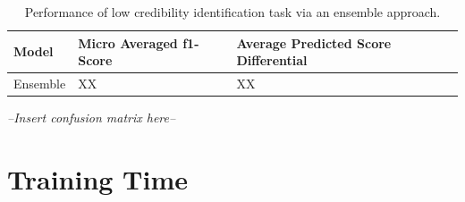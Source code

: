 \documentclass[a4paper,twoside,phd]{BYUPhys}
\begin{document}
\begin{table}[H]
	\centering
	
	\begin{tabular}{|p{4cm}|p{4cm}|p{4cm}|}
		\hline
		
		\textbf{Model} & \textbf{Micro Averaged \newline f1-Score} & \textbf{Average Predicted Score Differential}                                                                                                                                                                                                                                                                                                                                           \\
		\hline                                                                                                                                              
		
		Ensemble & XX & XX \\
		\hline
		
		
		
	\end{tabular}
	\caption{Performance of low credibility identification task via an ensemble approach.}
	\label{table:SingleModelApproach}
\end{table}

\textit{--Insert confusion matrix here--}


\section{Training Time}
\label{sec:TrainingTime}
\end{document}
